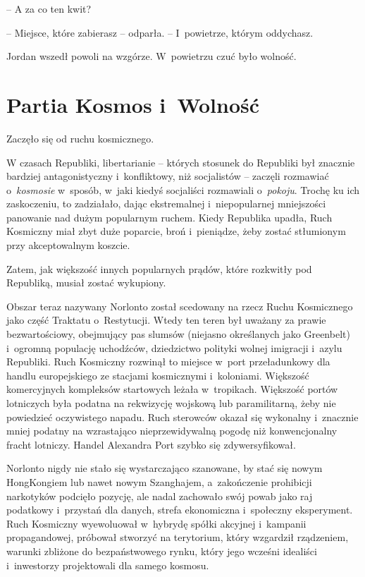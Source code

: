 \documentclass[oneside,polish,11pt,sfheadings]{mwbk}
\begin{document}
-- A za co ten kwit?

-- Miejsce, które zabierasz -- odparła. -- I~powietrze, którym oddychasz.

Jordan wszedł powoli na wzgórze. W~powietrzu czuć było wolność.

\chapter{Partia Kosmos i~Wolność}

Zaczęło się od ruchu kosmicznego.

W czasach Republiki, libertarianie -- których stosunek do Republiki był
znacznie bardziej antagonistyczny i~konfliktowy, niż socjalistów -- zaczęli rozmawiać o~\emph{kosmosie} w~sposób, w~jaki kiedyś socjaliści
rozmawiali o~\emph{pokoju}. Trochę ku ich zaskoczeniu, to zadziałało,
dając ekstremalnej i~niepopularnej mniejszości panowanie nad dużym
popularnym ruchem. Kiedy Republika upadła, Ruch Kosmiczny miał zbyt duże
poparcie, broń i~pieniądze, żeby zostać stłumionym przy akceptowalnym
koszcie.

Zatem, jak większość innych popularnych prądów, które rozkwitły pod
Republiką, musiał zostać wykupiony.

Obszar teraz nazywany Norlonto został scedowany na rzecz Ruchu
Kosmicznego jako część Traktatu o~Restytucji. Wtedy ten teren był
uważany za prawie bezwartościowy, obejmujący pas slumsów (niejasno
określanych jako Greenbelt) i~ogromną populację uchodźców, dziedzictwo
polityki wolnej imigracji i~azylu Republiki. Ruch Kosmiczny rozwinął to
miejsce w~port przeładunkowy dla handlu europejskiego ze stacjami
kosmicznymi i~koloniami. Większość komercyjnych kompleksów startowych
leżała w~tropikach. Większość portów lotniczych była podatna na
rekwizycję wojskową lub paramilitarną, żeby nie powiedzieć oczywistego
napadu. Ruch sterowców okazał się wykonalny i~znacznie mniej podatny na
wzrastająco nieprzewidywalną pogodę niż konwencjonalny fracht lotniczy.
Handel Alexandra Port szybko się zdywersyfikował.

Norlonto nigdy nie stało się wystarczająco szanowane, by stać się nowym
HongKongiem lub nawet nowym Szanghajem, a~zakończenie prohibicji
narkotyków podcięło pozycję, ale nadal zachowało swój powab jako raj
podatkowy i~przystań dla danych, strefa ekonomiczna i~społeczny
eksperyment. Ruch Kosmiczny wyewoluował w~hybrydę spółki akcyjnej i~kampanii propagandowej, próbował stworzyć na terytorium, który wzgardził
rządzeniem, warunki zbliżone do bezpaństwowego rynku, który jego wcześni
idealiści i~inwestorzy projektowali dla samego kosmosu.
\end{document}
